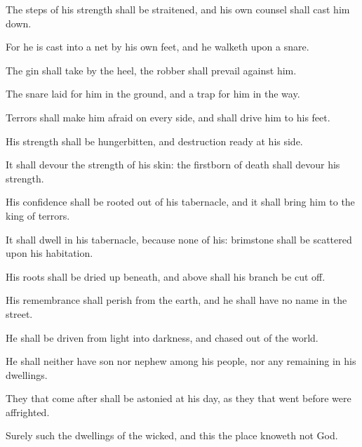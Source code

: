 {The
steps of his
strength shall be
straitened, and his own
counsel shall cast him
down.

For he is
cast into a
net by his own
feet, and he
walketh upon a
snare.

The
gin shall
take
{} by the
heel,
{} the
robber shall
prevail against him.

The
snare
{}
laid for him in the
ground, and a
trap for him in the
way.


\par }{\PP {}Terrors shall make him
afraid on every
side, and shall
drive him to his
feet.

His
strength shall be
hungerbitten, and
destruction
{}
ready at his
side.

It shall
devour the
strength of his
skin:
{} the
firstborn of
death shall
devour his
strength.

His
confidence shall be rooted
out of his
tabernacle, and it shall
bring him to the
king of
terrors.

It shall
dwell in his
tabernacle, because
{}
none of his:
brimstone shall be
scattered upon his
habitation.

His
roots shall be dried
up beneath, and
above shall his
branch be cut
off.

His
remembrance shall
perish from the
earth, and he shall have no
name in the
street.

He shall be
driven from
light into
darkness, and
chased out of the
world.

He shall neither have
son nor
nephew among his
people, nor any
remaining in his
dwellings.

They that come
after
{} shall be
astonied at his
day, as they that went
before were
affrighted.

Surely such
{} the
dwellings of the
wicked, and this
{} the
place
{}
knoweth not
God.




\par }
